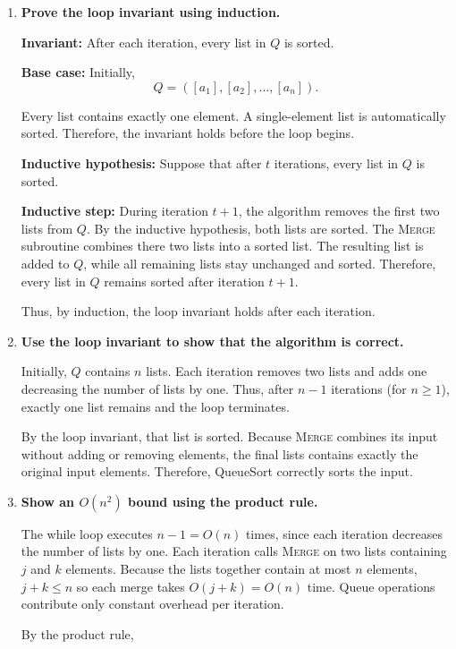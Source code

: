 \documentclass[11pt]{article}
\begin{document}
\begin{enumerate}[label=\textbf{(\alph*)},leftmargin=*]

\item \textbf{Prove the loop invariant using induction.}

\textbf{Invariant:} After each iteration, every list in $Q$ is sorted.

\textbf{Base case:} Initially,
\[
Q=([a_1],[a_2],\ldots,[a_n]).
\]

Every list contains exactly one element. A single-element list is automatically sorted. Therefore, the invariant holds before the loop begins.

\textbf{Inductive hypothesis:} Suppose that after $t$ iterations, every list in $Q$ is sorted.

\textbf{Inductive step:} During iteration $t+1$, the algorithm removes the first two lists from $Q$. By the inductive hypothesis, both lists are sorted. The \textsc{Merge} subroutine  combines there two lists into a 
sorted list. The resulting list is added to $Q$, while all remaining lists stay unchanged and sorted. Therefore, every list in $Q$ remains sorted after iteration $t+1$.

Thus, by induction, the loop invariant holds after each iteration.

\item \textbf{Use the loop invariant to show
that the algorithm is correct.}

Initially, $Q$ contains $n$ lists. Each iteration removes two lists and adds one decreasing the number of lists by one. Thus, after $n-1$ iterations (for $n\geq 1$), exactly one list remains and the loop terminates.

By the loop invariant, that list is sorted. Because \textsc{Merge} combines its input without adding or removing elements, the final lists contains exactly the original input elements. Therefore, QueueSort correctly sorts the input.

\item \textbf{Show an $O(n^2)$ bound using the product rule.}

The while loop executes $n-1=O(n)$ times, since each iteration decreases the number of lists by one. Each iteration calls \textsc{Merge} on two lists containing $j$ and $k$ elements. Because the lists together contain at most $n$ elements, $j+k\leq n$ so each merge takes $O(j+k)=O(n)$ time. Queue operations contribute only constant overhead per iteration.

By the product rule,


\end{enumerate}
\end{document}
